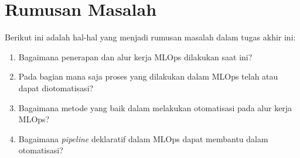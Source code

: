 \section{Rumusan Masalah}

Berikut ini adalah hal-hal yang menjadi rumusan masalah dalam tugas akhir ini:

\begin{enumerate}
    \item Bagaimana penerapan dan alur kerja MLOps dilakukan saat ini?
    \item Pada bagian mana saja proses yang dilakukan dalam MLOps telah atau dapat diotomatisasi?
    \item Bagaimana metode yang baik dalam melakukan otomatisasi pada alur kerja MLOps?
    \item Bagaimana \textit{pipeline} deklaratif dalam MLOps dapat membantu dalam otomatisasi?
\end{enumerate}